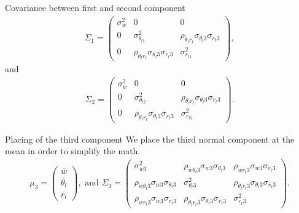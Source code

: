\documentclass[10pt]{beamer}
\numberwithin{equation}{section}
\begin{document}
    \begin{frame}{Covariance between first and second component}
        \begin{align}
            \Sigma_1 =
            \begin{pmatrix}
                \sigma_w^2 & 0                                                      & 0                                                      \\
                0          & \sigma_{\theta_{l1}}^2                                 & \rho_{\theta_l r_t} \sigma_{\theta_l 3} \sigma_{r_t 3} \\
                0          & \rho_{\theta_l r_t} \sigma_{\theta_l 3} \sigma_{r_t 3} & \sigma_{r_{t1}}^2
            \end{pmatrix},
        \end{align}
        and
        \begin{align}
            \Sigma_2 =
            \begin{pmatrix}
                \sigma_w^2 & 0                                                      & 0                                                      \\
                0          & \sigma_{\theta_{l2}}^2                                 & \rho_{\theta_l r_t} \sigma_{\theta_l 3} \sigma_{r_t 3} \\
                0          & \rho_{\theta_l r_t} \sigma_{\theta_l 3} \sigma_{r_t 3} & \sigma_{r_{t2}}^2
            \end{pmatrix}.
        \end{align}
    \end{frame}

    \begin{frame}{Placing of the third component}
        We place the third normal component at the mean in order to simplify the math.
        \begin{align}
            \mu_3 =
            \begin{pmatrix}
                \overline{w}        \\
                \overline{\theta_l} \\
                \overline{r_t}
            \end{pmatrix},
            \text{ and }
            \Sigma_3 =
            \begin{pmatrix}
                \sigma_{w 3}^2 &
                \rho_{w \theta_l 3} \sigma_{w 3} \sigma_{\theta_l 3} &
                \rho_{w r_t 3} \sigma_{w 3} \sigma_{r_t 3} \\
                \rho_{w \theta_l 3} \sigma_{w 3} \sigma_{\theta_l 3} &
                \sigma_{\theta_l 3}^2 &
                \rho_{\theta_l r_t 3} \sigma_{\theta_l 3} \sigma_{r_t 3} \\
                \rho_{w r_t 3} \sigma_{w 3} \sigma_{r_t 3} &
                \rho_{\theta_l r_t 3} \sigma_{\theta_l 3} \sigma_{r_t 3} &
                \sigma_{r_t 3}^2
            \end{pmatrix}.
        \end{align}
    \end{frame}
\end{document}
